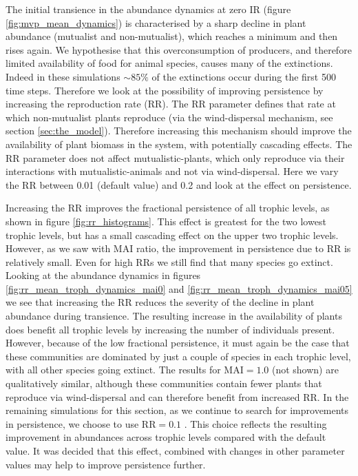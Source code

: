 The initial transience in the abundance dynamics at zero IR (figure \ref{fig:mvp_mean_dynamics}) is characterised by a sharp decline in plant abundance (mutualist and non-mutualist), which reaches a minimum and then rises again. We hypothesise that this overconsumption of producers, and therefore limited availability of food for animal species, causes many of the extinctions. Indeed in these simulations $\sim 85\%$ of the extinctions occur during the first 500 time steps. Therefore we look at the possibility of improving persistence by increasing the reproduction rate (RR). The RR parameter defines that rate at which non-mutualist plants reproduce (via the wind-dispersal mechanism, see section \ref{sec:the_model}). Therefore increasing this mechanism should improve the availability of plant biomass in the system, with potentially cascading effects. The RR parameter does not affect mutualistic-plants, which only reproduce via their interactions with mutualistic-animals and not via wind-dispersal. Here we vary the RR between 0.01 (default value) and 0.2 and look at the effect on persistence.

Increasing the RR improves the fractional persistence of all trophic levels, as shown in figure \ref{fig:rr_histograms}. This effect is greatest for the two lowest trophic levels, but has a small cascading effect on the upper two trophic levels. However, as we saw with MAI ratio, the improvement in persistence due to RR is  relatively small. Even for high RRs we still find that many species go extinct. Looking at the abundance dynamics in figures \ref{fig:rr_mean_troph_dynamics_mai0} and \ref{fig:rr_mean_troph_dynamics_mai05} we see that increasing the RR reduces the severity of the decline in plant abundance during transience. The resulting increase in the availability of plants does benefit all trophic levels by increasing the number of individuals present. However, because of the low fractional persistence, it must again be the case that these communities are dominated by just a couple of species in each trophic level, with all other species going extinct. The results for MAI$=1.0$ (not shown) are qualitatively similar, although these communities contain fewer plants that reproduce via wind-dispersal and can therefore benefit from increased RR. In the remaining simulations for this section, as we continue to search for improvements in persistence, we choose to use RR$=0.1$ . This choice reflects the resulting improvement in abundances across trophic levels compared with the default value. It was decided that this effect, combined with changes in other parameter values may help to improve persistence further. 

